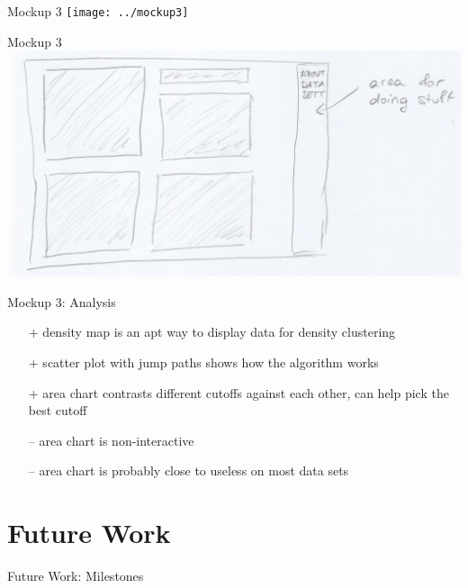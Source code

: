 \documentclass[naustrian]{beamer}
\begin{document}
\begin{frame}{Mockup 3}
    \texttt{[image: ../mockup3]}
\end{frame}

\begin{frame}{Mockup 3}
    \includegraphics[width=\textwidth]{../mockup3-ui}
\end{frame}

\begin{frame}{Mockup 3: Analysis}
    \begin{itemize}
        \item[\color{asparagus}+] density map is an apt way to display data for density clustering
        \item[\color{asparagus}+] scatter plot with jump paths shows how the algorithm works
        \item[\color{asparagus}+] area chart contrasts different cutoffs against each other, can help pick the best cutoff

        \item[\color{alizarin}--] area chart is non-interactive
        \item[\color{alizarin}--] area chart is probably close to useless on most data sets
    \end{itemize}
\end{frame}

\section{Future Work}

\begin{frame}{Future Work: Milestones}
\end{frame}
\end{document}
